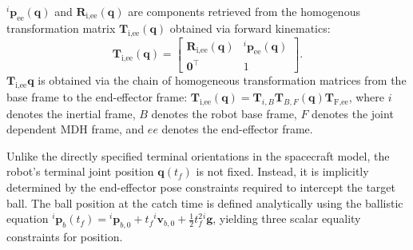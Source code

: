 ${}^i\mathbf{p}_{\text{ee}}(\mathbf{q})$ and $\mathbf{R}_{\text{i,ee}}(\mathbf{q})$ are components retrieved from the homogenous transformation matrix $\mathbf{T}_{\text{i,ee}}(\mathbf{q})$ obtained via forward kinematics:
\begin{equation}
    \mathbf{T}_{\text{i,ee}}(\mathbf{q}) = 
    \begin{bmatrix}
        \mathbf{R}_{\text{i,ee}}(\mathbf{q}) & {}^i\mathbf{p}_{\text{ee}}(\mathbf{q}) \\
        \mathbf{0}^\top & 1
    \end{bmatrix}
    .
\end{equation}
$\mathbf{T}_{\text{i,ee}}\mathbf{q}$ is obtained via the chain of homogeneous transformation matrices from the base frame to the end-effector frame:
$\mathbf{T}_{\text{i,ee}}(\mathbf{q}) = \mathbf{T}_{i,B} \mathbf{T}_{B,F}(\mathbf{q}) \mathbf{T}_{\text{F,ee}}$, 
where $i$ denotes the inertial frame, 
$B$ denotes the robot base frame, 
$F$ denotes the joint dependent \ac{MDH} frame, 
and $ee$ denotes the end-effector frame.

Unlike the directly specified terminal orientations in the spacecraft model, the robot's terminal joint position $\mathbf{q}(t_f)$ is not fixed. 
Instead, it is implicitly determined by the end-effector pose constraints required to intercept the target ball. 
The ball position at the catch time is defined analytically using the ballistic equation ${}^i \mathbf{p}_b(t_f) = {}^i \mathbf{p}_{b,0} + t_f {}^i \mathbf{v}_{b,0} + \frac{1}{2}t_f^2 {}^i \mathbf{g}$, yielding three scalar equality constraints for position. 

